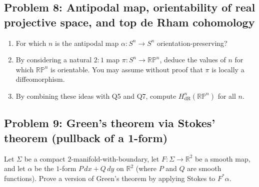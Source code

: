 \documentclass[12pt,a4paper]{article}
\theoremstyle{plain}
\theoremstyle{definition}      %
\begin{document}
	\subsection*{Problem 8: Antipodal map, orientability of real projective space, and top de Rham cohomology}
	\begin{enumerate}
		\item[(a)] For which $n$ is the antipodal map $\alpha: S^n \to S^n$ orientation-preserving?
		\item[(b)] By considering a natural $2:1$ map $\pi: S^n \to \mathbb{RP}^n$, deduce the values of $n$ for which
		$\mathbb{RP}^n$ is orientable. You may assume without proof that $\pi$ is locally a diffeomorphism.
		\item[(c)] By combining these ideas with Q5 and Q7, compute $H^n_{\mathrm{dR}}(\mathbb{RP}^n)$ for all $n$.
	\end{enumerate}
	
	\subsection*{Problem 9: Green's theorem via Stokes' theorem (pullback of a 1-form)}
	Let $\Sigma$ be a compact $2$-manifold-with-boundary, let $F : \Sigma \to \mathbb{R}^2$ be a smooth map,
	and let $\alpha$ be the $1$-form $P\,dx + Q\,dy$ on $\mathbb{R}^2$ (where $P$ and $Q$ are smooth functions).
	Prove a version of Green's theorem by applying Stokes to $F^{*}\alpha$.
	
	
	
\end{document}
